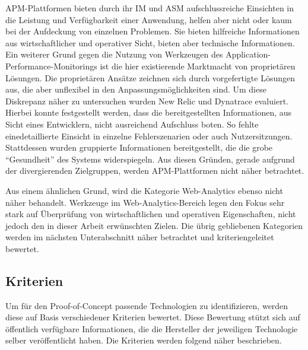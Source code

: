 APM-Plattformen bieten durch ihr IM und ASM aufschlussreiche Einsichten in die Leistung und Verfügbarkeit einer Anwendung, helfen aber nicht oder kaum bei der Aufdeckung von einzelnen Problemen. Sie bieten hilfreiche Informationen aus wirtschaftlicher und operativer Sicht, bieten aber technische Informationen. Ein weiterer Grund gegen die Nutzung von Werkzeugen des Application-Performance-Monitorings ist die hier existierende Marktmacht von proprietären Lösungen. Die proprietären Ansätze zeichnen sich durch vorgefertigte Lösungen aus, die aber unflexibel in den Anpassungsmöglichkeiten sind. Um diese Diskrepanz näher zu untersuchen wurden New Relic und Dynatrace evaluiert. Hierbei konnte festgestellt werden, dass die bereitgestellten Informationen, aus Sicht eines Entwicklern, nicht ausreichend Aufschluss boten. So fehlte einedetaillierte Einsicht in einzelne Fehlerszenarien oder auch Nutzersitzungen. Stattdessen wurden gruppierte Informationen bereitgestellt, die die grobe \enquote{Gesundheit} des Systems widerspiegeln. Aus diesen Gründen, gerade aufgrund der divergierenden Zielgruppen, werden APM-Plattformen nicht näher betrachtet.

Aus einem ähnlichen Grund, wird die Kategorie Web-Analytics ebenso nicht näher behandelt. Werkzeuge im Web-Analytics-Bereich legen den Fokus sehr stark auf Überprüfung von wirtschaftlichen und operativen Eigenschaften, nicht jedoch den in dieser Arbeit erwünschten Zielen. Die übrig gebliebenen Kategorien werden im nächsten Unterabschnitt näher betrachtet und kriteriengeleitet bewertet.

\subsection{Kriterien}

Um für den Proof-of-Concept passende Technologien zu identifizieren, werden diese auf Basis verschiedener Kriterien bewertet. Diese Bewertung stützt sich auf öffentlich verfügbare Informationen, die die Hersteller der jeweiligen Technologie selber veröffentlicht haben. Die Kriterien werden folgend näher beschrieben.

